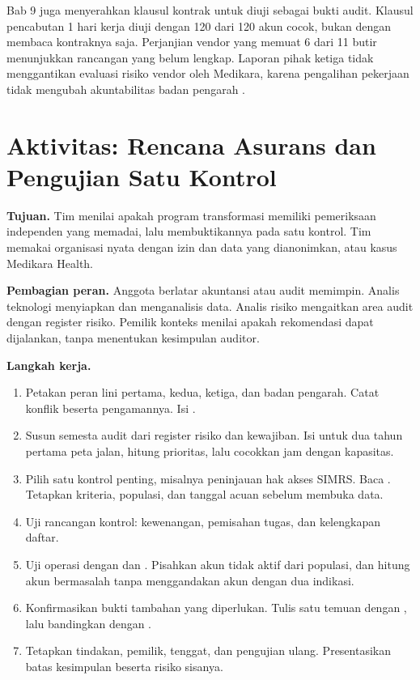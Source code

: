 Bab 9 juga menyerahkan klausul kontrak untuk diuji sebagai bukti audit. Klausul pencabutan 1 hari
kerja diuji dengan 120 dari 120 akun cocok, bukan dengan membaca kontraknya saja. Perjanjian vendor
yang memuat 6 dari 11 butir menunjukkan rancangan yang belum lengkap. Laporan pihak ketiga tidak
menggantikan evaluasi risiko vendor oleh Medikara, karena pengalihan pekerjaan tidak mengubah
akuntabilitas badan pengarah \cite{iia-tlm2026}.

\section{Aktivitas: Rencana Asurans dan Pengujian Satu Kontrol}

\textbf{Tujuan.} Tim menilai apakah program transformasi memiliki pemeriksaan independen yang
memadai, lalu membuktikannya pada satu kontrol. Tim memakai organisasi nyata dengan izin dan data
yang dianonimkan, atau kasus Medikara Health.

\textbf{Pembagian peran.} Anggota berlatar akuntansi atau audit memimpin. Analis teknologi
menyiapkan dan menganalisis data. Analis risiko mengaitkan area audit dengan register risiko.
Pemilik konteks menilai apakah rekomendasi dapat dijalankan, tanpa menentukan kesimpulan auditor.

\textbf{Langkah kerja.}
\begin{enumerate}
  \item Petakan peran lini pertama, kedua, ketiga, dan badan pengarah. Catat konflik beserta
  pengamannya. Isi .
  \item Susun semesta audit dari register risiko dan kewajiban. Isi
   untuk dua tahun pertama peta jalan, hitung
  prioritas, lalu cocokkan jam dengan kapasitas.
  \item Pilih satu kontrol penting, misalnya peninjauan hak akses SIMRS. Baca
  . Tetapkan kriteria, populasi, dan tanggal
  acuan sebelum membuka data.
  \item Uji rancangan kontrol: kewenangan, pemisahan tugas, dan kelengkapan daftar.
  \item Uji operasi dengan  dan
  . Pisahkan akun tidak aktif dari populasi, dan
  hitung akun bermasalah tanpa menggandakan akun dengan dua indikasi.
  \item Konfirmasikan bukti tambahan yang diperlukan. Tulis satu temuan dengan
  , lalu bandingkan dengan
  .
  \item Tetapkan tindakan, pemilik, tenggat, dan pengujian ulang. Presentasikan batas kesimpulan
  beserta risiko sisanya.
\end{enumerate}

